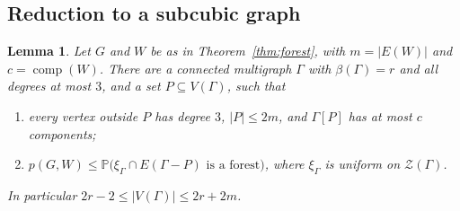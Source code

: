\documentclass[11pt]{article}
\newtheorem{lemma}[theorem]{Lemma}
\theoremstyle{definition}
\theoremstyle{remark}
\newcommand{\Z}{\mathcal{Z}}
\newcommand{\PP}{\mathbb{P}}
\newcommand{\comp}{\operatorname{comp}}
\numberwithin{equation}{section}
\begin{document}
\subsection{Reduction to a subcubic graph}

\begin{lemma}\label{lem:reduce}
Let $G$ and $W$ be as in Theorem~\ref{thm:forest}, with $m=|E(W)|$ and $c=\comp(W)$. There are a
connected multigraph $\Gamma$ with $\beta(\Gamma)=r$ and all degrees at most $3$, and a set
$P\subseteq V(\Gamma)$, such that
\begin{enumerate}
\item[\textup{(i)}] every vertex outside $P$ has degree $3$, $|P|\le2m$, and $\Gamma[P]$ has at
most $c$ components;
\item[\textup{(ii)}] $p(G,W)\le\PP\bigl(\xi_\Gamma\cap E(\Gamma-P)\text{ is a forest}\bigr)$, where
$\xi_\Gamma$ is uniform on $\Z(\Gamma)$.
\end{enumerate}
In particular $2r-2\le|V(\Gamma)|\le2r+2m$.
\end{lemma}
\end{document}

